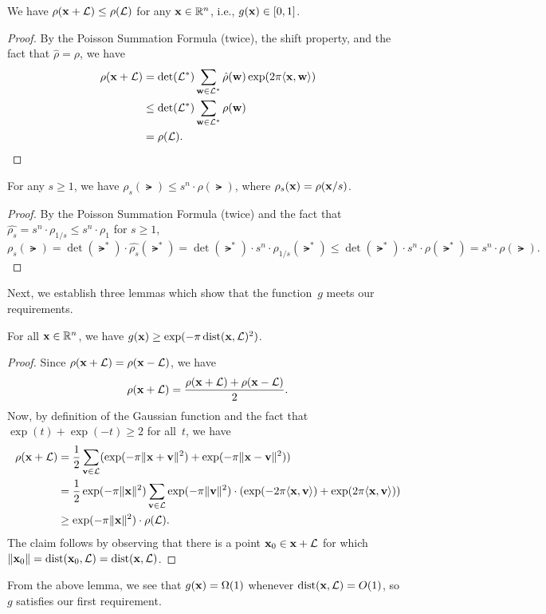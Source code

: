 \documentclass[11pt]{article}
\begin{document}
\begin{claim}
  We have $\rho(\mathbf{x} + \mathcal{L}) \leq \rho(\mathcal{L})$ for any $\mathbf{x} \in
  \mathbb{R}^n$, i.e., $g(\mathbf{x}) \in [0,1]$.
\end{claim}

\begin{proof}
  By the Poisson Summation Formula (twice), the shift property, and
  the fact that $\hat{\rho} = \rho$, we have
  \begin{align*}
    \rho(\mathbf{x} + \mathcal{L})
    &= \det(\mathcal{L}^*) \sum_{\mathbf{w} \in \mathcal{L}^*} \hat{\rho}(\mathbf{w})\exp(2 \pi \langle\mathbf{x},\mathbf{w}\rangle ) \\
    &\leq   \det(\mathcal{L}^*)\sum_{\mathbf{w} \in \mathcal{L}^*} \rho(\mathbf{w}) \\
    &=  \rho(\mathcal{L}).
  \end{align*}
\end{proof}

\begin{claim}
  \label{clm:gaussian-scale}
  For any $s \geq 1$, we have
  $\rho_s(\lat) \leq s^{n} \cdot \rho(\lat)$, where
  $\rho_s(\mathbf{x}) = \rho(\mathbf{x}/s)$.
\end{claim}

\begin{proof}
  By the Poisson Summation Formula (twice) and the fact that
  $\widehat{\rho_{s}} = s^{n} \cdot \rho_{1/s} \leq s^{n} \cdot
  \rho_{1}$ for $s \geq 1$,
  \[ \rho_s(\lat) = \det(\lat^*) \cdot \widehat{\rho_{s}}(\lat^*) =
    \det(\lat^{*}) \cdot s^{n} \cdot \rho_{1/s}(\lat^{*}) \leq
    \det(\lat^{*}) \cdot s^{n} \cdot \rho(\lat^{*}) = s^{n} \cdot
    \rho(\lat). \]
\end{proof}

\noindent Next, we establish three lemmas which show that the
function~$g$ meets our requirements.

\begin{lemma}
  For all $\mathbf{x} \in \mathbb{R}^{n}$, we have
  $g(\mathbf{x}) \geq \exp(-\pi \operatorname{dist}(\mathbf{x},\mathcal{L})^2)$.
\end{lemma}

\begin{proof}
  Since $\rho(\mathbf{x}+\mathcal{L}) = \rho(\mathbf{x}-\mathcal{L})$, we have
  \[ \rho(\mathbf{x}+\mathcal{L}) = \frac{\rho(\mathbf{x}+\mathcal{L}) +
      \rho(\mathbf{x}-\mathcal{L})}{2}. \] Now, by definition of the Gaussian
  function and the fact that $\exp(t) + \exp(-t) \geq 2$ for all~$t$,
  we have
  \begin{align*}
    \rho(\mathbf{x}+\mathcal{L})
    &= \frac12 \sum_{\mathbf{v} \in \mathcal{L}} ( \exp(-\pi \lVert\mathbf{x}+\mathbf{v}\rVert^2)+ \exp(-\pi \lVert\mathbf{x}-\mathbf{v}\rVert^2)) \\
    &= \frac12 \exp(-\pi \lVert\mathbf{x}\rVert^2)
      \sum_{\mathbf{v} \in \mathcal{L}} \exp(-\pi \lVert\mathbf{v}\rVert^2) \cdot
      (\exp(-2\pi \langle\mathbf{x},\mathbf{v}\rangle)+\exp(2\pi \langle\mathbf{x},\mathbf{v}\rangle)) \\
    &\geq \exp(-\pi \lVert\mathbf{x}\rVert^{2}) \cdot \rho(\mathcal{L}) .
  \end{align*}
  The claim follows by observing that there is a point
  $\mathbf{x}_0 \in \mathbf{x} + \mathcal{L}$ for which
  $\lVert\mathbf{x}_0\rVert=\operatorname{dist}(\mathbf{x}_0,\mathcal{L}) = \operatorname{dist}(\mathbf{x},\mathcal{L})$.
\end{proof}
From the above lemma, we see that $g(\mathbf{x}) = \Omega(1)$ whenever
$\operatorname{dist}(\mathbf{x},\mathcal{L}) = O(1)$, so~$g$ satisfies our first requirement.
\end{document}

